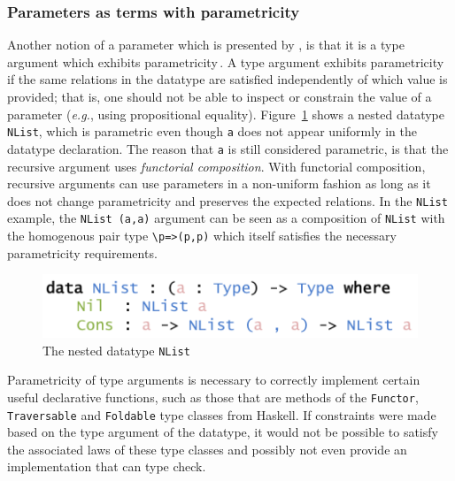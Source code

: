 \documentclass{ituthesis}
\newcommand{\tttype}[1]{\textcolor{type-color}{\texttt{#1}}}
\newcommand{\ttvar}[1]{\textcolor{local-var-color}{\texttt{#1}}}
\theoremstyle{break}
\begin{document}
\subsubsection{Parameters as terms with parametricity}
\label{ssub:Parameters as terms with parametricity}
Another notion of a parameter which is presented by \textcite{bernardy2010parametricity}, is that it is a type argument which exhibits parametricity\,\autocite{DBLP:conf/ifip/Reynolds83,Wadler89theoremsfor}.
A type argument exhibits parametricity if the same relations in the datatype are satisfied independently of which value is provided; that is, one should not be able to inspect or constrain the value of a parameter (\textit{e.g.}, using propositional equality).
Figure~\ref{fig:nestedlist} shows a nested datatype\,\autocite{bird1998nested} \tttype{NList}, which is parametric even though \ttvar{a} does not appear uniformly in the datatype declaration.
The reason that \ttvar{a} is still considered parametric, is that the recursive argument uses \textit{functorial composition}.
With functorial composition, recursive arguments can use parameters in a non-uniform fashion as long as it does not change parametricity and preserves the expected relations.
In the \tttype{NList} example, the \tttype{NList}~\tttype{(}\ttvar{a}\tttype{,}\ttvar{a}\tttype{)} argument can be seen as a composition of \tttype{NList} with the homogenous pair type \texttt{\textbackslash}\ttvar{p}\texttt{=>}\tttype{(}\ttvar{p}\tttype{,}\ttvar{p}\tttype{)} which itself satisfies the necessary parametricity requirements.

\begin{figure}[ht]
\begin{center}
    \includegraphics[scale=0.5]{Figures/NestedList.png}
\end{center}
\caption{The nested datatype \tttype{NList}}
\label{fig:nestedlist}
\end{figure}

Parametricity of type arguments is necessary to correctly implement certain useful declarative functions, such as those that are methods of the \tttype{Functor}, \tttype{Traversable} and \tttype{Foldable} type classes from Haskell.
If constraints were made based on the type argument of the datatype, it would not be possible to satisfy the associated laws of these type classes and possibly not even provide an implementation that can type check.
\end{document}
